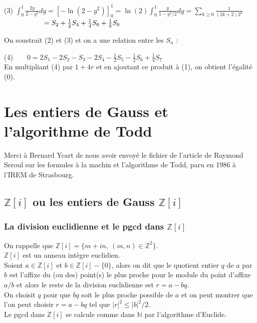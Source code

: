 \documentclass[a4paper,11pt]{book}
\newcommand{\Z}{{\mathbb{Z}}}
\newcommand{\N}{{\mathbb{N}}}
\begin{document}
   (3) $\displaystyle \int_0^1\frac{2y}{2-y^2}dy=[-\ln(2-y^2)]_0^1=\ln(2) \int_0^1\frac{y}{1-y^2/2}dy=\sum_{k\geq 0}\frac{1}{(2k+2)2^k}$\\
$\hspace*{2cm}=S_2+\frac{1}{2} S_4+\frac{1}{4} S_6+\frac{1}{8} S_8$

On soustrait (2) et (3) et on a  une relation entre les $S_n$ :

   (4)$\qquad 0=2S_1-2S_2-S_3-2S_4-\frac{1}{2}S_5-\frac{1}{2} S_6+\frac{1}{4}S_7$\\ 
En multipliant (4) par $1+4r$ et en ajoutant ce produit \`a (1), on obtient 
l'\'egalit\'e (0).

\chapter{Les entiers de Gauss et l'algorithme de Todd}
Merci \`a Bernard Ycart de nous avoir envoy\'e le fichier
de l'article de Raymond Seroul sur les formules \`a la
machin et l'algorithme de Todd, paru en 1986 \`a l'IREM de Strasbourg.
\section{$\Z[i]$ ou les entiers de Gauss $\Z[i]$}
\subsection{La division euclidienne et le pgcd dans $\Z[i]$}
On rappelle que $\Z[i]=\{m+in,\ (m,n)\in \Z^2\}$.\\
$\Z[i]$ est un anneau int\`egre euclidien.\\
Soient $a \in \Z[i]$ et $b \in \Z[i]-\{0\}$, alors on dit que le quotient entier
$q$ de $a$ par $b$ est l'affixe du (ou des) point(s) le plus proche pour le 
module du point d'affixe $a/b$ et alors le reste de la division euclidienne est
$r=a-bq$.\\ 
On choisit $q$ pour que $bq$ soit le plus proche 
possible de $a$ et on peut montrer que l'on peut choisir $r=a-bq$ tel que 
$|r|^2 \leq |b|^2/2$.\\
Le pgcd dans  $\Z[i]$ se calcule  comme dans $\N$ par l'algorithme d'Euclide.
\end{document}
